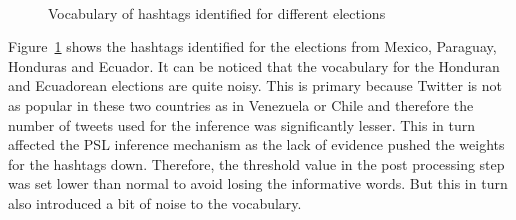 \begin{figure}[scale=0.75]
	\centering
	 \\
	\noindent 
	\caption{Vocabulary of hashtags identified for different elections} 
	\label{fig:countrywordCloud}
\end{figure}

Figure~\ref{fig:countrywordCloud} shows the hashtags identified for the elections from Mexico, Paraguay, Honduras and Ecuador.
It can be noticed that the vocabulary for the Honduran and Ecuadorean  elections are quite noisy. 
This is primary because Twitter is not as popular in these two countries as in Venezuela or Chile and therefore the number of tweets
used for the inference was significantly lesser.
This in turn affected the PSL inference mechanism as the lack of evidence pushed the weights for the hashtags down.
Therefore, the threshold value in the post processing step was set lower than normal to avoid losing the informative words.
But this in turn also introduced a bit of noise to the vocabulary.
